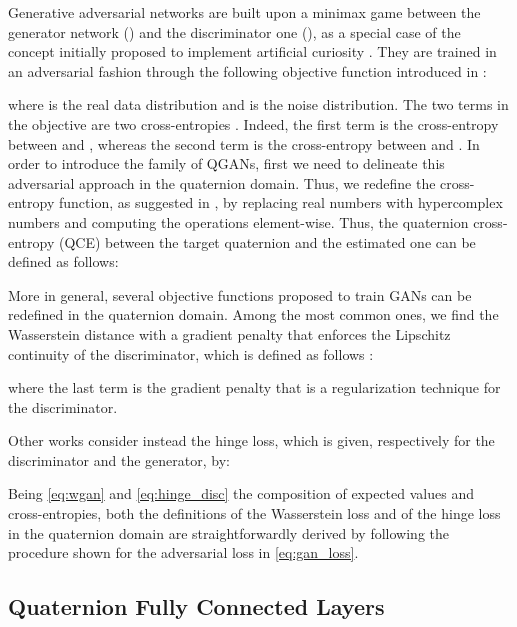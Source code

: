 \documentclass[graybox]{svmult}
\begin{document}
\noindent Generative adversarial networks are built upon a minimax game between the generator network () and the discriminator one (), as a special case of the concept initially proposed to implement artificial curiosity \cite{SchmidhuberMIT1991, SchmidhuberNEUNET2020}. They are trained in an adversarial fashion through the following objective function introduced in \cite{GoodfellowNIPS2014}:



\noindent where  is the real data distribution and  is the noise distribution. The two terms in the objective are two cross-entropies \cite{Gui2020ARO}. Indeed, the first term is the cross-entropy between  and , whereas the second term is the cross-entropy between  and . 
In order to introduce the family of QGANs, first we need to delineate this adversarial approach in the quaternion domain. Thus, we redefine the cross-entropy function, as suggested in \cite{ParcolletAIR2019}, by replacing real numbers with hypercomplex numbers and computing the operations element-wise. Thus, the quaternion cross-entropy (QCE) between the target quaternion  and the estimated one  can be defined as follows:



More in general, several objective functions proposed to train GANs can be redefined in the quaternion domain.
Among the most common ones, we find the Wasserstein distance with a gradient penalty that enforces the Lipschitz continuity of the discriminator, which is defined as follows \cite{Arjovsky2017WassersteinG, GulrajaniNIPS2017}: 



\noindent where the last term is the gradient penalty that is a regularization technique for the discriminator.

Other works \cite{Miyato2018SpectralNF, Chen2019SelfSupervisedGV} consider instead the hinge loss, which is given, respectively for the discriminator and the generator, by:





Being \eqref{eq:wgan} and \eqref{eq:hinge_disc} the composition of expected values and cross-entropies, both the definitions of the Wasserstein loss and of the hinge loss in the quaternion domain are straightforwardly derived by following the procedure shown for the adversarial loss in \eqref{eq:gan_loss}.


\subsection{Quaternion Fully Connected Layers}
\end{document}
